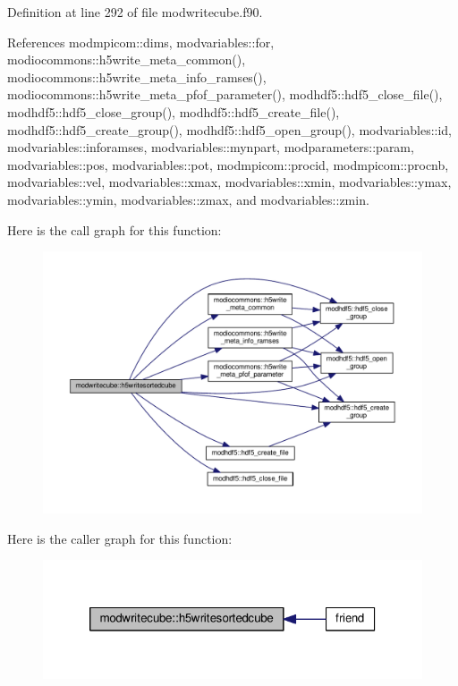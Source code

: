 Definition at line 292 of file modwritecube.\+f90.



References modmpicom\+::dims, modvariables\+::for, modiocommons\+::h5write\+\_\+meta\+\_\+common(), modiocommons\+::h5write\+\_\+meta\+\_\+info\+\_\+ramses(), modiocommons\+::h5write\+\_\+meta\+\_\+pfof\+\_\+parameter(), modhdf5\+::hdf5\+\_\+close\+\_\+file(), modhdf5\+::hdf5\+\_\+close\+\_\+group(), modhdf5\+::hdf5\+\_\+create\+\_\+file(), modhdf5\+::hdf5\+\_\+create\+\_\+group(), modhdf5\+::hdf5\+\_\+open\+\_\+group(), modvariables\+::id, modvariables\+::inforamses, modvariables\+::mynpart, modparameters\+::param, modvariables\+::pos, modvariables\+::pot, modmpicom\+::procid, modmpicom\+::procnb, modvariables\+::vel, modvariables\+::xmax, modvariables\+::xmin, modvariables\+::ymax, modvariables\+::ymin, modvariables\+::zmax, and modvariables\+::zmin.



Here is the call graph for this function\+:\nopagebreak
\begin{figure}[H]
\begin{center}
\leavevmode
\includegraphics[width=350pt]{namespacemodwritecube_a8af2220dcc73a35204f76527d4559e52_cgraph}
\end{center}
\end{figure}




Here is the caller graph for this function\+:\nopagebreak
\begin{figure}[H]
\begin{center}
\leavevmode
\includegraphics[width=320pt]{namespacemodwritecube_a8af2220dcc73a35204f76527d4559e52_icgraph}
\end{center}
\end{figure}


